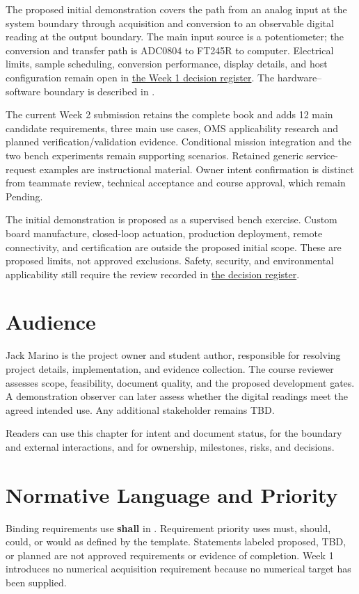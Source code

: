The proposed initial demonstration covers the path from an analog input at
the system boundary through acquisition and conversion to an observable digital
reading at the output boundary. The main input source is a potentiometer; the conversion and transfer path
is ADC0804 to FT245R to computer. Electrical limits, sample scheduling,
conversion performance, display details, and host configuration remain open in
\hyperref[Table:WeekOneTBDs]{the Week 1 decision register}.
The hardware--software boundary is described in .

The current Week 2 submission retains the complete book and adds 12 main
candidate requirements, three main use cases, OMS applicability research and
planned verification/validation evidence. Conditional mission integration and
the two bench experiments remain supporting scenarios. Retained generic
service-request examples are instructional material. Owner intent confirmation
is distinct from teammate review, technical acceptance and course approval,
which remain Pending.

\begin{dsnNote}
The initial demonstration is proposed as a supervised bench exercise.
Custom board manufacture, closed-loop actuation, production deployment,
remote connectivity, and certification are outside the proposed initial scope.
These are proposed limits, not approved exclusions. Safety, security, and
environmental applicability still require the review recorded in
\hyperref[Table:WeekOneTBDs]{the decision register}.
\end{dsnNote}

\section{Audience}
Jack Marino is the project owner and student author, responsible for resolving
project details, implementation, and evidence collection. The course reviewer
assesses scope, feasibility, document quality, and the proposed development
gates. A demonstration observer can later assess whether the digital readings
meet the agreed intended use. Any additional stakeholder remains TBD.

Readers can use this chapter for intent and document status,
 for the boundary and external interactions, and
 for ownership, milestones, risks, and decisions.

\section{Normative Language and Priority}
Binding requirements use \textbf{shall} in .
Requirement priority uses \gls{must}, \gls{should}, \gls{could}, or \gls{would}
as defined by the template. Statements labeled proposed, TBD, or planned are
not approved requirements or evidence of completion. Week 1 introduces no
numerical acquisition requirement because no numerical target has been supplied.

